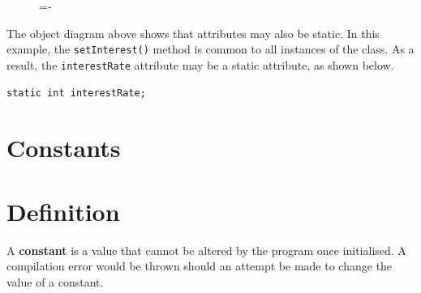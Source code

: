 \documentclass[a4paper]{systems-software}
\begin{document}
\begin{figure}[H]
	\lineskip=-\fboxrule
\end{figure}

The object diagram above shows that attributes may also be static. In this example, the \texttt{setInterest()} method is common to all instances of the class. As a result, the \texttt{interestRate} attribute may be a static attribute, as shown below.

\begin{lstlisting}[title={Defining a static attribute.}]
static int interestRate;
\end{lstlisting}


\section{Constants}

\section*{Definition}

A \textbf{constant} is a value that cannot be altered by the program once initialised. A compilation error would be thrown should an attempt be made to change the value of a constant.
\end{document}
